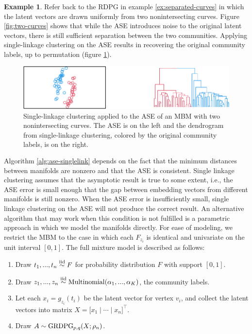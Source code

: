 \documentclass[
  12pt,
]{article}
\providecommand{\tightlist}{%
  \setlength{\itemsep}{0pt}\setlength{\parskip}{0pt}}
\theoremstyle{definition}
\theoremstyle{definition}
\newtheorem{example}{Example}[section]
\theoremstyle{definition}
\theoremstyle{definition}
\theoremstyle{remark}
\begin{document}
\begin{example}
\label{ex:separated-curves-2}
Refer back to the RDPG in example \ref{ex:separated-curves} in which the latent vectors are drawn uniformly from two nonintersecting curves. 
Figure \ref{fig:two-curves} shows that while the ASE introduces noise to the original latent vectors, there is still sufficient separation between the two communities. 
Applying single-linkage clustering on the ASE results in recovering the original community labels, up to permutation (figure \ref{fig:two-curves-2}). 

\begin{figure}[H]

{\centering \includegraphics{draft_files/figure-latex/two-curves-2-1} 

}

\caption{Single-linkage clustering applied to the ASE of an MBM with two nonintersecting curves. The ASE is on the left and the dendrogram from single-linkage clustering, colored by the original community labels, is on the right.}\label{fig:two-curves-2}
\end{figure}
\end{example}

Algorithm \ref{alg:ase-singlelink} depends on the fact that the minimum distances between manifolds are nonzero and that the ASE is consistent.
Single linkage clustering assumes that the asymptotic result is true to some extent, i.e., the ASE error is small enough that the gap between embedding vectors from different manifolds is still nonzero.
When the ASE error is insufficiently small, single linkage clustering on the ASE will not produce the correct result.
An alternative algorithm that may work when this condition is not fulfilled is a parametric approach in which we model the manifolds directly.
For ease of modeling, we restrict the MBM to the case in which each \(F_{z_i}\) is identical and univariate on the unit interval \([0, 1]\).
The full mixture model is described as follows:

\begin{enumerate}
\def\labelenumi{\arabic{enumi}.}
\tightlist
\item
  Draw \(t_1, ..., t_n \stackrel{\mathrm{iid}}{\sim} F\) for probability distribution \(F\) with support \([0, 1]\).
\item
  Draw \(z_1, ..., z_n \stackrel{\mathrm{iid}}{\sim} \mathrm{Multinomial}(\alpha_1, ..., \alpha_K)\), the community labels.
\item
  Let each \(x_i = g_{z_i}(t_i)\) be the latent vector for vertex \(v_i\), and collect the latent vectors into matrix \(X = \Big[ x_1 \mid \cdots \mid x_n \Big]^\top\).
\item
  Draw \(A \sim \mathrm{GRDPG}_{p,q}(X; \rho_n)\).
\end{enumerate}
\end{document}
